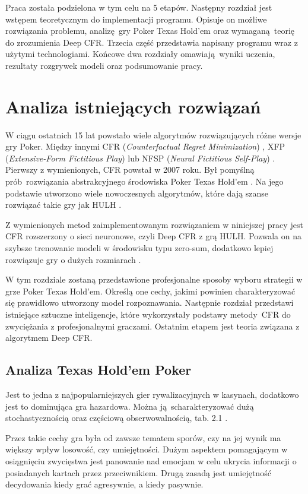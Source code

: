 \documentclass[12pt,oneside,a4paper]{report}
\begin{document}
Praca została podzielona w tym celu na 5 etapów.
Następny rozdział jest wstępem teoretycznym do implementacji programu. Opisuje on 
możliwe rozwiązania problemu, analizę gry Poker Texas Hold'em
oraz wymaganą teorię do zrozumienia Deep CFR. 
Trzecia część przedstawia napisany programu wraz z użytymi technologiami. Końcowe dwa rozdziały 
omawiają wyniki uczenia, rezultaty
rozgrywek modeli oraz podsumowanie pracy.

\chapter{Analiza istniejących rozwiązań}

W ciągu ostatnich 15 lat powstało wiele algorytmów rozwiązujących różne wersje gry Poker.
Między innymi CFR (\emph{Counterfactual Regret Minimization}) \cite{CFR}, XFP (\emph{Extensive-Form
Fictitious Play}) \cite{XFP} lub
NFSP (\emph{Neural Fictitious Self-Play}) \cite{NFSP}.
Pierwszy z wymienionych, CFR powstał w 2007 roku. Był 
pomyślną prób rozwiązania abstrakcyjnego środowiska Poker Texas Hold'em \cite{CFR}. 
Na jego podstawie utworzono wiele nowoczesnych
algorytmów, które dają szanse rozwiązać takie gry jak HULH \cite{CFR}.


Z wymienionych metod zaimplementowanym rozwiązaniem w niniejszej pracy jest CFR 
rozszerzony o sieci neuronowe,
czyli Deep CFR z grą HULH. Pozwala on na szybsze trenowanie modeli w środowisku typu zero-sum,
dodatkowo lepiej rozwiązuje gry o dużych rozmiarach \cite{DCFR}.

W tym rozdziale zostaną przedstawione profesjonalne sposoby wyboru strategii w grze Poker Texas Hold'em. 
Określą one cechy, jakimi powinien charakteryzować się prawidłowo utworzony model rozpoznawania.
Następnie rozdział przedstawi istniejące sztuczne inteligencje, które wykorzystały podstawy
metody CFR do
zwyciężania z profesjonalnymi graczami.
Ostatnim etapem jest teoria związana z algorytmem Deep CFR.

\section{Analiza Texas Hold'em Poker}

Jest to jedna z najpopularniejszych gier rywalizacyjnych w kasynach, dodatkowo jest to
dominująca gra hazardowa. Można ją scharakteryzować dużą stochastycznością oraz częściową 
obserwowalnością, tab. 2.1 \cite{poker}.  


Przez takie cechy gra była od zawsze tematem sporów, czy na jej wynik ma większy wpływ
losowość, czy umiejętności. Dużym aspektem pomagającym w osiągnięciu zwycięstwa
jest panowanie nad emocjam w celu ukrycia informacji o posiadanych kartach przez przeciwnikiem.
Drugą zasadą jest umiejętność decydowania kiedy grać agresywnie, a kiedy pasywnie.
\end{document}
